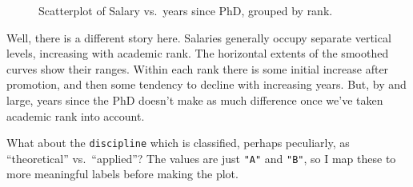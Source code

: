 \documentclass[
  letterpaper,
  10pt,
  krantz2]{krantz}
\begin{document}
\begin{figure}[H]


\caption{\label{fig-Salaries-rank}Scatterplot of Salary vs.~years since
PhD, grouped by rank.}

\end{figure}%

Well, there is a different story here. Salaries generally occupy
separate vertical levels, increasing with academic rank. The horizontal
extents of the smoothed curves show their ranges. Within each rank there
is some initial increase after promotion, and then some tendency to
decline with increasing years. But, by and large, years since the PhD
doesn't make as much difference once we've taken academic rank into
account.

What about the \texttt{discipline} which is classified, perhaps
peculiarly, as ``theoretical'' vs.~``applied''? The values are just
\texttt{"A"} and \texttt{"B"}, so I map these to more meaningful labels
before making the plot.
\end{document}
